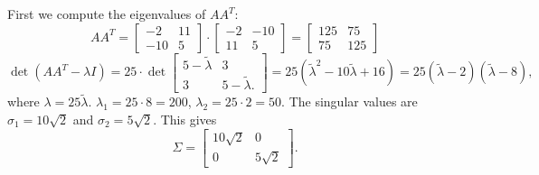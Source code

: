 \documentclass[14pt, notitlepage]{article}
\begin{document}
First we compute the eigenvalues of $AA^T$:
\[
    AA^T = \begin{bmatrix}
        -2  & 11 \\
        -10 & 5
    \end{bmatrix}
    \cdot
    \begin{bmatrix}
        -2 & -10 \\
        11 & 5
    \end{bmatrix}
    =
    \begin{bmatrix}
        125 & 75 \\
        75 & 125
    \end{bmatrix}
\]
\[
    \det\left(AA^T - \lambda I \right) = 
    25 \cdot \det \begin{bmatrix}
        5 - \tilde{\lambda} & 3 \\
        3 & 5 - \tilde{\lambda}.
    \end{bmatrix} = 
    25 \left(\tilde{\lambda}^2 - 10\tilde{\lambda} + 16 \right) =
    25 \left(\tilde{\lambda} - 2 \right) \left(\tilde{\lambda} - 8 \right),
\]
where $\lambda = 25\tilde{\lambda}$. $\lambda_1 = 25 \cdot 8 = 200$, $\lambda_2 = 25 \cdot 2 = 50$.
The singular values are $\sigma_1 = 10\sqrt{2}$ and $\sigma_2 = 5\sqrt{2}$. This gives
\[
    \Sigma = \begin{bmatrix}
        10\sqrt{2} & 0 \\
        0 & 5\sqrt{2}
    \end{bmatrix}.
\]
\end{document}
